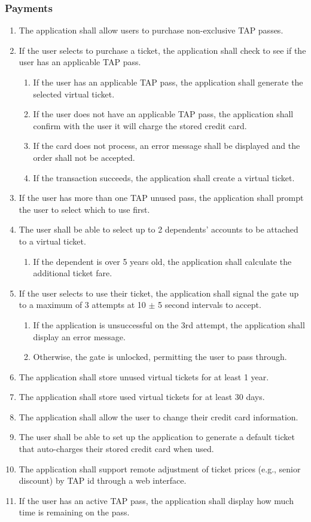 	\subsubsection{Payments}\begin{enumerate}
		\item The application shall allow users to purchase non-exclusive TAP passes.
		\item If the user selects to purchase a ticket, the application shall check to see if the user has an applicable TAP pass.
			\begin{enumerate}
				\item If the user has an applicable TAP pass, the application shall generate the selected virtual ticket.
				\item If the user does not have an applicable TAP pass, the application shall confirm with the user it will charge the stored credit card.
				\item If the card does not process, an error message shall be displayed and the order shall not be accepted. 
				\item If the transaction succeeds, the application shall create a virtual ticket. 
			\end{enumerate}
		\item If the user has more than one TAP unused pass, the application shall prompt the user to select which to use first.
		\item The user shall be able to select up to 2 dependents’ accounts to be attached to a virtual ticket.
			\begin{enumerate}
				\item If the dependent is over 5 years old, the application shall calculate the additional ticket fare.
			\end{enumerate}
		\item If the user selects to use their ticket, the application shall signal the gate up to a maximum of 3 attempts at 10 $\pm$ 5 second intervals to accept.
			\begin{enumerate}
				\item If the application is unsuccessful on the 3rd attempt, the application shall display an error message.
				\item Otherwise, the gate is unlocked, permitting the user to pass through.
			\end{enumerate}
		\item The application shall store unused virtual tickets for at least 1 year. 
		\item The application shall store used virtual tickets for at least 30 days.
		\item The application shall allow the user to change their credit card information.
		\item The user shall be able to set up the application to generate a default ticket that auto-charges their stored credit card when used.
		\item The application shall support remote adjustment of ticket prices (e.g., senior discount) by TAP id through a web interface.
		\item If the user has an active TAP pass, the application shall display how much time is remaining on the pass.
	\end{enumerate}		
\newpage	
